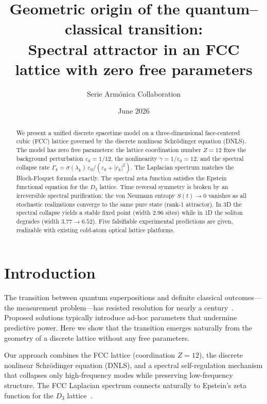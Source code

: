 \documentclass[twocolumn]{article}
\begin{document}
\title{Geometric origin of the quantum--classical transition:\\
  Spectral attractor in an FCC lattice with zero free parameters}
\author{Serie Arm\'onica Collaboration}
\date{June 2026}
\maketitle

\begin{abstract}
  We present a unified discrete spacetime model on a three-dimensional
  face-centered cubic (FCC) lattice governed by the discrete nonlinear
  Schr\"odinger equation (DNLS). The model has zero free parameters:
  the lattice coordination number $Z=12$ fixes the background perturbation
  $\varepsilon_0=1/12$, the nonlinearity $\gamma=1/\varepsilon_0=12$,
  and the spectral collapse rate $\Gamma_k=\sigma(\lambda_k)\,
  \varepsilon_0/(\varepsilon_0+|c_k|^2)$. The Laplacian spectrum matches
  the Bloch-Floquet formula exactly. The spectral zeta function satisfies
  the Epstein functional equation for the $D_3$ lattice. Time reversal
  symmetry is broken by an irreversible spectral purification: the von
  Neumann entropy $S(t)\to0$ vanishes as all stochastic realizations
  converge to the same pure state (rank-1 attractor). In 3D the spectral
  collapse yields a stable fixed point (width $2.96$ sites) while in 1D
  the soliton degrades (width $3.77\to6.52$). Five falsifiable
  experimental predictions are given, realizable with existing cold-atom
  optical lattice platforms.
\end{abstract}

\section{Introduction}

The transition between quantum superpositions and definite classical
outcomes---the measurement problem---has resisted resolution for nearly
a century~\cite{penrose1996, diosi1987}. Proposed solutions typically
introduce ad-hoc parameters that undermine predictive power. Here we
show that the transition emerges naturally from the geometry of a
discrete lattice without any free parameters.

Our approach combines the FCC lattice (coordination $Z=12$), the
discrete nonlinear Schr\"odinger equation (DNLS), and a spectral
self-regulation mechanism that collapses only high-frequency modes
while preserving low-frequency structure. The FCC Laplacian spectrum
connects naturally to Epstein's zeta function for the $D_3$
lattice~\cite{epstein1903, sarnak2006}.
\end{document}
